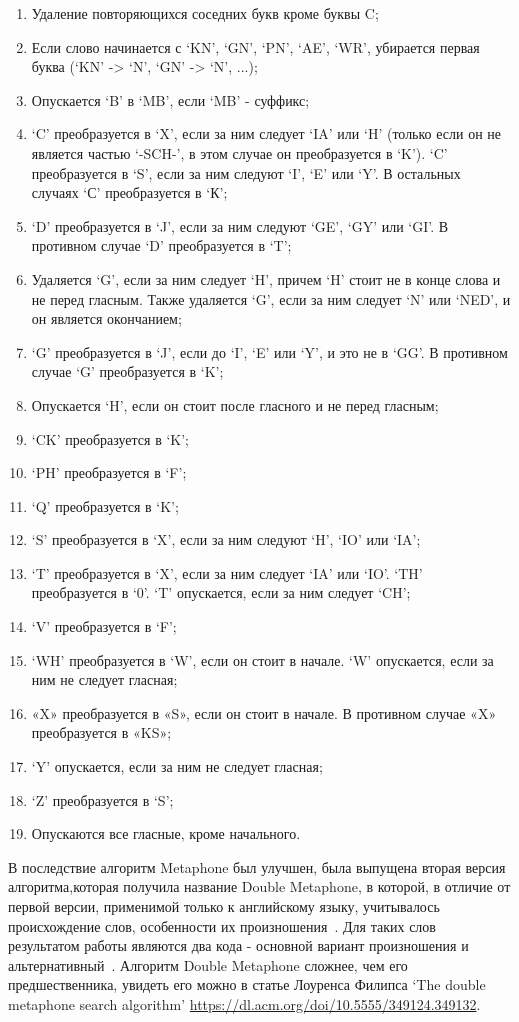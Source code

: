 \begin{enumerate}
  \item Удаление повторяющихся соседних букв кроме буквы C;
  \item Если слово начинается с `KN', `GN', `PN', `AE', `WR', убирается первая буква (`KN' -> `N', `GN' -> `N', ...);
  \item Опускается `B' в `MB', если `MB' - суффикс;
  \item `C' преобразуется в `X', если за ним следует `IA' или `H' (только если он не является частью `-SCH-', в этом случае он преобразуется в `K'). `C' преобразуется в `S', если за ним следуют `I', `E' или `Y'. В остальных случаях `С' преобразуется в `К';
  \item `D' преобразуется в `J', если за ним следуют `GE', `GY' или `GI'. В противном случае `D' преобразуется в `T';
  \item Удаляется `G', если за ним следует `H', причем `H' стоит не в конце слова и не перед гласным. Также удаляется `G', если за ним следует `N' или `NED', и он является окончанием;
  \item `G' преобразуется в `J', если до `I', `E' или `Y', и это не в `GG'. В противном случае `G' преобразуется в `K';
  \item Опускается `H', если он стоит после гласного и не перед гласным;
  \item `CK' преобразуется в `K';
  \item `PH' преобразуется в `F';
  \item `Q' преобразуется в `K';
  \item `S' преобразуется в `X', если за ним следуют `H', `IO' или `IA';
  \item `T' преобразуется в `X', если за ним следует `IA' или `IO'. `TH' преобразуется в `0'. `T' опускается, если за ним следует `CH';
  \item `V' преобразуется в `F';
  \item `WH' преобразуется в `W', если он стоит в начале. `W' опускается, если за ним не следует гласная;
  \item «X» преобразуется в «S», если он стоит в начале. В противном случае «X» преобразуется в «KS»;
  \item `Y' опускается, если за ним не следует гласная;
  \item `Z' преобразуется в `S';
  \item Опускаются все гласные, кроме начального.
\end{enumerate}

В последствие алгоритм Metaphone был улучшен, была выпущена вторая версия алгоритма,которая получила название Double Metaphone, в которой, в отличие от первой версии, применимой только к английскому языку, учитывалось происхождение слов, особенности их произношения~\cite{phonetic2}. Для таких слов результатом работы являются два кода - основной вариант произношения и альтернативный~\cite{phonetic}. Алгоритм Double Metaphone сложнее, чем его предшественника, увидеть его можно в статье Лоуренса Филипса `The double metaphone search algorithm' \url{https://dl.acm.org/doi/10.5555/349124.349132}.

